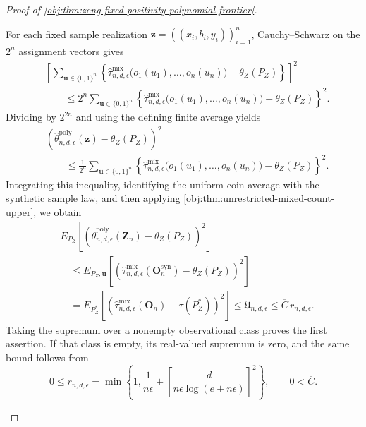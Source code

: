 \begin{proof}[Proof of \cref{obj:thm:zeng-fixed-positivity-polynomial-frontier}]
\begin{enumerate}
For each fixed sample realization
\(\mathbf z=((x_i,b_i,y_i))_{i=1}^n\), Cauchy--Schwarz on the
\(2^n\) assignment vectors gives
\[
\begin{split}
&\left[
\sum_{\mathbf u\in\{0,1\}^n}
\left\{
\widehat\tau^{\mathrm{mix}}_{n,d,\epsilon}
\bigl(o_1(u_1),\ldots,o_n(u_n)\bigr)
-\theta_Z(P_Z)
\right\}
\right]^2\\
&\qquad\le
2^n\sum_{\mathbf u\in\{0,1\}^n}
\left\{
\widehat\tau^{\mathrm{mix}}_{n,d,\epsilon}
\bigl(o_1(u_1),\ldots,o_n(u_n)\bigr)
-\theta_Z(P_Z)
\right\}^2.
\end{split}
\]
Dividing by \(2^{2n}\) and using the defining finite average yields
\[
\begin{split}
&\left(
\widehat\theta^{\mathrm{poly}}_{n,d,\epsilon}(\mathbf z)
-\theta_Z(P_Z)
\right)^2\\
&\qquad\le
\frac1{2^n}
\sum_{\mathbf u\in\{0,1\}^n}
\left\{
\widehat\tau^{\mathrm{mix}}_{n,d,\epsilon}
\bigl(o_1(u_1),\ldots,o_n(u_n)\bigr)
-\theta_Z(P_Z)
\right\}^2.
\end{split}
\]
Integrating this inequality, identifying the uniform coin average with
the synthetic sample law, and then applying
\cref{obj:thm:unrestricted-mixed-count-upper}, we obtain
\[
\begin{split}
&E_{P_Z}\!\left[
\left(
\widehat\theta^{\mathrm{poly}}_{n,d,\epsilon}(\mathbf Z_n)
-\theta_Z(P_Z)
\right)^2
\right]\\
&\quad\le
E_{P_Z,\mathbf u}\!\left[
\left(
\widehat\tau^{\mathrm{mix}}_{n,d,\epsilon}
(\mathbf O_n^{\mathrm{syn}})
-\theta_Z(P_Z)
\right)^2
\right]\\
&\quad=
E_{P_Z^*}\!\left[
\left(
\widehat\tau^{\mathrm{mix}}_{n,d,\epsilon}(\mathbf O_n)
-\tau(P_Z^*)
\right)^2
\right]
\le \mathfrak U_{n,d,\epsilon}
\le \overline C\,r_{n,d,\epsilon}.
\end{split}
\]
Taking the supremum over a nonempty observational class proves the
first assertion. If that class is empty, its real-valued supremum is
zero, and the same bound follows from
\[
0\le r_{n,d,\epsilon}
=
\min\left\{
1,\frac1{n\epsilon}
+\left[\frac d{n\epsilon\log(e+n\epsilon)}\right]^2
\right\},
\qquad
0<\overline C.
\]


\end{enumerate}
\end{proof}
